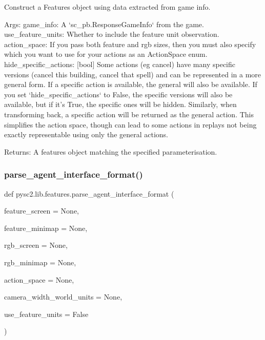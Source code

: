 \begin{DoxyVerb}Construct a Features object using data extracted from game info.

Args:
  game_info: A `sc_pb.ResponseGameInfo` from the game.
  use_feature_units: Whether to include the feature unit observation.
  action_space: If you pass both feature and rgb sizes, then you must also
      specify which you want to use for your actions as an ActionSpace enum.
  hide_specific_actions: [bool] Some actions (eg cancel) have many
      specific versions (cancel this building, cancel that spell) and can
      be represented in a more general form. If a specific action is
      available, the general will also be available. If you set
      `hide_specific_actions` to False, the specific versions will also be
      available, but if it's True, the specific ones will be hidden.
      Similarly, when transforming back, a specific action will be returned
      as the general action. This simplifies the action space, though can
      lead to some actions in replays not being exactly representable using
      only the general actions.

Returns:
  A features object matching the specified parameterisation.\end{DoxyVerb}
 \mbox{\label{namespacepysc2_1_1lib_1_1features_a5075b8a72e7dbe879edda0d3dbe902fe}} 
\subsubsection{\texorpdfstring{parse\+\_\+agent\+\_\+interface\+\_\+format()}{parse\_agent\_interface\_format()}}
{\footnotesize\ttfamily def pysc2.\+lib.\+features.\+parse\+\_\+agent\+\_\+interface\+\_\+format (\begin{DoxyParamCaption}\item[{}]{feature\+\_\+screen = {\ttfamily None},  }\item[{}]{feature\+\_\+minimap = {\ttfamily None},  }\item[{}]{rgb\+\_\+screen = {\ttfamily None},  }\item[{}]{rgb\+\_\+minimap = {\ttfamily None},  }\item[{}]{action\+\_\+space = {\ttfamily None},  }\item[{}]{camera\+\_\+width\+\_\+world\+\_\+units = {\ttfamily None},  }\item[{}]{use\+\_\+feature\+\_\+units = {\ttfamily False} }\end{DoxyParamCaption})}

